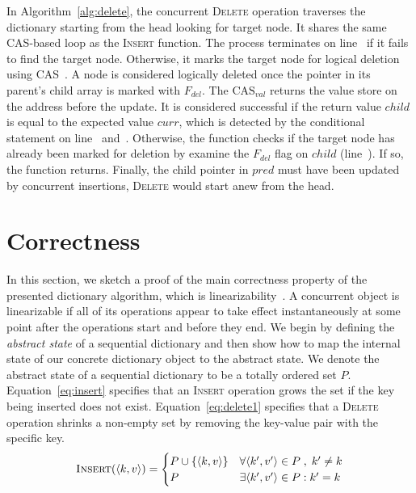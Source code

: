 \documentclass[10pt,conference,compsocconf]{IEEEtran}
\begin{document}
In Algorithm~\ref{alg:delete}, the concurrent \textsc{Delete} operation traverses the dictionary starting from the head looking for target node.
It shares the same CAS-based loop as the \textsc{Insert} function.
The process terminates on line~ if it fails to find the target node.
Otherwise, it marks the target node for logical deletion using CAS~.
A node is considered logically deleted once the pointer in its parent's child array is marked with $F_{del}$.
The $\text{CAS}_{val}$ returns the value store on the address before the update.
It is considered successful if the return value $child$ is equal to the expected value $curr$, which is detected by the conditional statement on line~ and~.
Otherwise, the function checks if the target node has already been marked for deletion by examine the $F_{del}$ flag on $child$ (line~).
If so, the function returns.
Finally, the child pointer in $pred$ must have been updated by concurrent insertions, \textsc{Delete} would start anew from the head.

\section{Correctness}
\label{sec:correctness}
In this section, we sketch a proof of the main correctness property of the presented dictionary algorithm, which is linearizability~\cite{herlihy1990linearizability}. 
A concurrent object is linearizable if all of its operations appear to take effect instantaneously at some point after the operations start and before they end.
We begin by defining the \emph{abstract state} of a sequential dictionary and then show how to map the internal state of our concrete dictionary object to the abstract state.
We denote the abstract state of a sequential dictionary to be a totally ordered set $P$.
Equation~\ref{eq:insert} specifies that an \textsc{Insert} operation grows the set if the key being inserted does not exist.
Equation~\ref{eq:delete1} specifies that a \textsc{Delete} operation shrinks a non-empty set by removing the key-value pair with the specific key.
\vspace{-0.06in}
\begin{equation} \label{eq:insert}
    \textsc{Insert}(\langle k,v \rangle)= \begin{cases}
        P \cup \{\langle k,v\rangle\} & \forall \langle k',v'\rangle \in P\;,\;k' \neq k\\
        P & \exists \langle k',v' \rangle \in P : k'=k
    \end{cases}
\end{equation}
\end{document}
